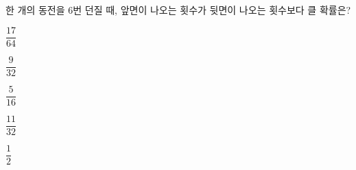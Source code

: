 한 개의 동전을 6번 던질 때, 앞면이 나오는 횟수가 뒷면이 나오는 횟수보다 클 확률은?
\begin{choices32}{\rule[-3ex]{0pt}{8ex}$\dfrac{17}{64}$}{\rule[-3ex]{0pt}{8ex}$\dfrac{9}{32}$}{\rule[-3ex]{0pt}{8ex}$\dfrac{5}{16}$}{\rule[-3ex]{0pt}{8ex}$\dfrac{11}{32}$}{\rule[-3ex]{0pt}{8ex}$\dfrac{1}{2}$}\end{choices32}
